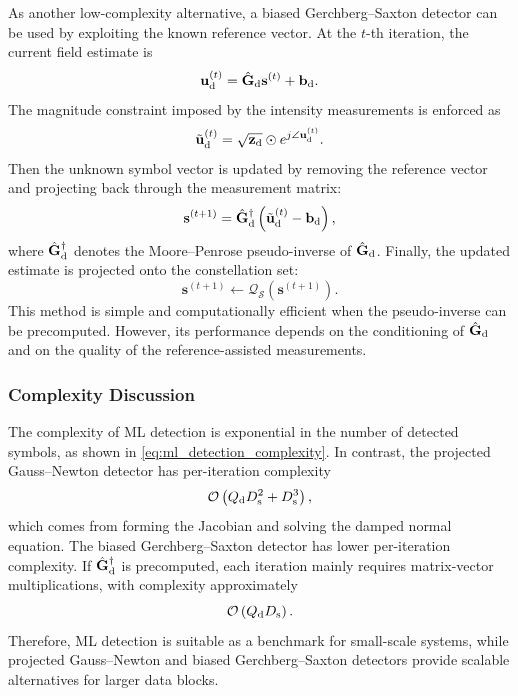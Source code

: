 \documentclass[journal]{IEEEtran}
\begin{document}
As another low-complexity alternative, a biased Gerchberg--Saxton detector can be used by exploiting the known reference vector. 
At the $t$-th iteration, the current field estimate is
\begin{equation}
\mathbf{u}_{\rm d}^{(t)}
=
\hat{\mathbf{G}}_{\rm d}\mathbf{s}^{(t)}
+
\mathbf{b}_{\rm d}.
\end{equation}
The magnitude constraint imposed by the intensity measurements is enforced as
\begin{equation}
\tilde{\mathbf{u}}_{\rm d}^{(t)}
=
\sqrt{\mathbf{z}_{\rm d}}
\odot
e^{j\angle \mathbf{u}_{\rm d}^{(t)}}.
\label{eq:gs_magnitude_projection}
\end{equation}
Then the unknown symbol vector is updated by removing the reference vector and projecting back through the measurement matrix:
\begin{equation}
\mathbf{s}^{(t+1)}
=
\hat{\mathbf{G}}_{\rm d}^{\dagger}
\left(
\tilde{\mathbf{u}}_{\rm d}^{(t)}
-
\mathbf{b}_{\rm d}
\right),
\label{eq:biased_gs_update}
\end{equation}
where $\hat{\mathbf{G}}_{\rm d}^{\dagger}$ denotes the Moore--Penrose pseudo-inverse of $\hat{\mathbf{G}}_{\rm d}$. 
Finally, the updated estimate is projected onto the constellation set:
\begin{equation}
\mathbf{s}^{(t+1)}
\leftarrow
\mathcal{Q}_{\mathcal{S}}
\left(
\mathbf{s}^{(t+1)}
\right).
\label{eq:biased_gs_constellation_projection}
\end{equation}
This method is simple and computationally efficient when the pseudo-inverse can be precomputed. 
However, its performance depends on the conditioning of $\hat{\mathbf{G}}_{\rm d}$ and on the quality of the reference-assisted measurements.

\subsubsection{Complexity Discussion}

The complexity of ML detection is exponential in the number of detected symbols, as shown in \eqref{eq:ml_detection_complexity}. 
In contrast, the projected Gauss--Newton detector has per-iteration complexity
\begin{equation}
\mathcal{O}
\left(
Q_{\rm d}D_{\rm s}^{2}
+
D_{\rm s}^{3}
\right),
\label{eq:symbol_gn_complexity}
\end{equation}
which comes from forming the Jacobian and solving the damped normal equation. 
The biased Gerchberg--Saxton detector has lower per-iteration complexity. 
If $\hat{\mathbf{G}}_{\rm d}^{\dagger}$ is precomputed, each iteration mainly requires matrix-vector multiplications, with complexity approximately
\begin{equation}
\mathcal{O}
\left(
Q_{\rm d}D_{\rm s}
\right).
\label{eq:biased_gs_complexity}
\end{equation}
Therefore, ML detection is suitable as a benchmark for small-scale systems, while projected Gauss--Newton and biased Gerchberg--Saxton detectors provide scalable alternatives for larger data blocks.
\end{document}
